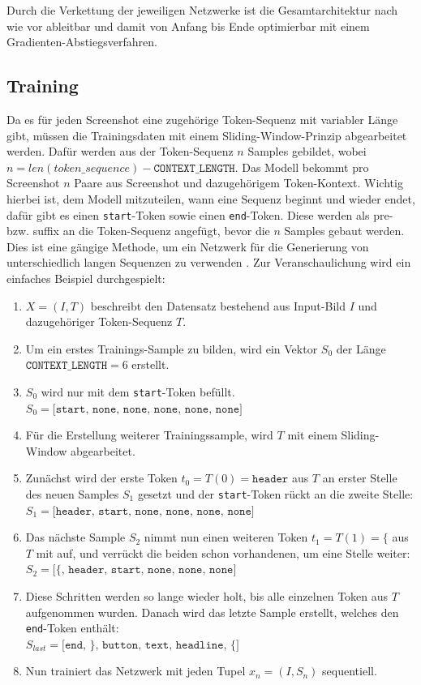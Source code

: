 \documentclass[pdftex,a4paper,halfparskip, article]{scrartcl}
\begin{document}
Durch die Verkettung der jeweiligen Netzwerke ist die Gesamtarchitektur nach wie vor ableitbar und damit von Anfang bis Ende optimierbar mit einem Gradienten-Abstiegsverfahren.

\subsection{Training}\label{sub:training}

Da es für jeden Screenshot eine zugehörige Token-Sequenz mit variabler Länge gibt, müssen die Trainingsdaten mit einem Sliding-Window-Prinzip abgearbeitet werden. Dafür werden aus der Token-Sequenz $n$ Samples gebildet, wobei $n = len(token\_sequence) - \texttt{CONTEXT\_LENGTH}$. Das Modell bekommt pro Screenshot $n$ Paare aus Screenshot und dazugehörigem Token-Kontext. Wichtig hierbei ist, dem Modell mitzuteilen, wann eine Sequenz beginnt und wieder endet, dafür gibt es einen \texttt{start}-Token sowie einen \texttt{end}-Token. Diese werden als pre- bzw. suffix an die Token-Sequenz angefügt, bevor die $n$ Samples gebaut werden. Dies ist eine gängige Methode, um ein Netzwerk für die Generierung von unterschiedlich langen Sequenzen zu verwenden \cite{DBLP:journals/corr/Graves13}. Zur Veranschaulichung wird ein einfaches Beispiel durchgespielt:

\begin{enumerate}
	\item $X = (I, T)$ beschreibt den Datensatz bestehend aus Input-Bild $I$ und dazugehöriger Token-Sequenz $T$.
	\item Um ein erstes Trainings-Sample zu bilden, wird ein Vektor $S_0$ der Länge $\texttt{CONTEXT\_LENGTH} = 6$ erstellt.
	\item $S_0$ wird nur mit dem \texttt{start}-Token befüllt. $S_0 = \texttt{[start, none, none, none, none, none]}$
	\item Für die Erstellung weiterer Trainingssample, wird $T$ mit einem Sliding-Window abgearbeitet. 
	\item Zunächst wird der erste Token $t_0 = T(0) = \texttt{header}$ aus $T$ an erster Stelle des neuen Samples $S_1$ gesetzt und der \texttt{start}-Token rückt an die zweite Stelle: \\
	$S_1 = \texttt{[header, start, none, none, none, none]}$
	\item Das nächste Sample $S_2$ nimmt nun einen weiteren Token $t_1 = T(1) = \{$ aus $T$ mit auf, und verrückt die beiden schon vorhandenen, um eine Stelle weiter: \\
	$S_2 = \texttt{[\{, header, start, none, none, none]}$
	\item Diese Schritten werden so lange wieder holt, bis alle einzelnen Token aus $T$ aufgenommen wurden. Danach wird das letzte Sample erstellt, welches den \texttt{end}-Token enthält: \\
	$S_{last} = \texttt{[end, \}, button, text, headline, \{]}$
	\item Nun trainiert das Netzwerk mit jeden Tupel $x_n = (I, S_n)$ sequentiell.
\end{enumerate}
\end{document}
